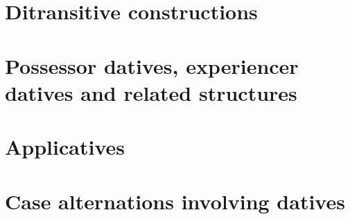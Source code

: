 \documentclass[output=book,modfonts,nonflat,collection,collectionchapter ,multiauthors
		,colorlinks,citecolor=brown
		  ]{langsci/langscibook}
\begin{document}
\maketitle
\frontmatter

{\sloppy\tableofcontents}

\lsCollectionPaperFrontmatterMode %
\lsCollectionPaperMainmatterMode %
\setcounter{chapter}{0} %
\mainmatter
\part{Ditransitive constructions}
\part{Possessor datives, experiencer datives and related structures}
\part{Applicatives}
\part{Case alternations involving datives}

\end{document}
